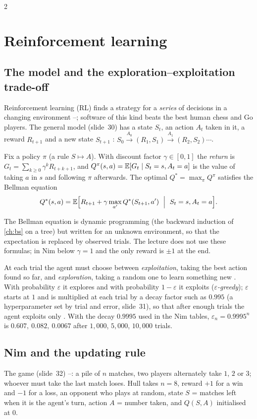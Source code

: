 \begin{paracol}{2}
\section{Reinforcement learning}\label{ch16:sec-rl}
\subsection{The model and the exploration--exploitation trade-off}
Reinforcement learning (RL) finds a strategy for a \emph{series} of decisions in a changing environment --; software of this kind beats the best human chess and Go players. The general model (slide~30) has a state $S_t$, an action $A_t$ taken in it,
a reward $R_{t+1}$ and a new state $S_{t+1}$ : $S_0\xrightarrow{A_0}(R_1,S_1)\xrightarrow{A_1}(R_2,S_2)\cdots$.

\begin{definition}\label{ch16:def-Q}
Fix a policy $\pi$ (a rule $S\mapsto A$). With discount factor $\gamma\in[0,1]$ the \emph{return} is $G_t=\sum_{k\ge0}\gamma^kR_{t+k+1}$, and
$Q^\pi(s,a)=\mathbb{E}[G_t\mid S_t=s,A_t=a]$ is the value of taking $a$ in $s$ and following $\pi$ afterwards. The optimal $Q^*=\max_\pi Q^\pi$ satisfies the Bellman equation
\[
  Q^*(s,a)=\E\Bigl[R_{t+1}+\gamma\max_{a'}Q^*(S_{t+1},a')\ \Bigm|\ S_t=s,A_t=a\Bigr].
\]
\end{definition}
The Bellman equation is dynamic programming (the backward induction of \cref{ch:bs} on a tree) but written for an unknown environment, so that the expectation is replaced by observed trials. The lecture does not use these formulas; in Nim below $\gamma=1$ and the only reward is $\pm1$ at the end.

At each trial the agent must choose between \emph{exploitation}, taking the best action found so far, and \emph{exploration}, taking a random one to learn something new . With probability $\varepsilon$ it explores and with probability $1-\varepsilon$ it
exploits (\emph{$\varepsilon$-greedy}); $\varepsilon$ starts at $1$ and is multiplied at each trial by a decay factor such as $0.995$ (a hyperparameter set by trial and error, slide~31), so that after enough trials the agent exploits only . With the decay $0.9995$ used
in the Nim tables, $\varepsilon_n=0.9995^n$ is $0.607,\ 0.082,\ 0.0067$ after $1{,}000$, $5{,}000$, $10{,}000$ trials.

\subsection{Nim and the updating rule}
The game (slide~32) --: a pile of $n$ matches, two players alternately take $1$, $2$ or $3$; whoever must take the last match loses. Hull takes $n=8$, reward $+1$ for a win and $-1$ for a loss, an opponent who plays at random, state $S$ = matches left when it is the agent's turn, action
$A$ = number taken, and $Q(S,A)$ initialised at $0$.


\end{paracol}
